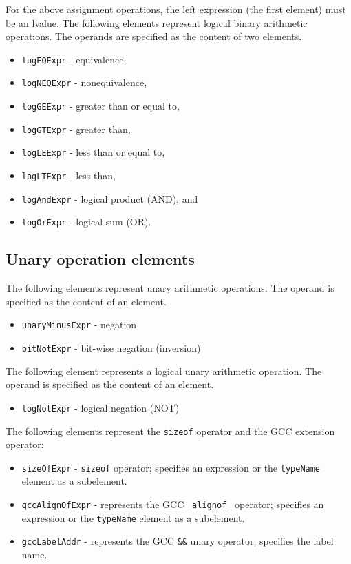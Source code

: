 For the above assignment operations, the left expression (the first element) must be an lvalue.
The following elements represent logical binary arithmetic operations. The operands are specified as the content of two elements.

\begin{itemize}
\item {\tt logEQExpr} - equivalence,
\item {\tt logNEQExpr} - nonequivalence,
\item {\tt logGEExpr} - greater than or equal to,
\item {\tt logGTExpr} - greater than,
\item {\tt logLEExpr} - less than or equal to,
\item {\tt logLTExpr} - less than,
\item {\tt logAndExpr} - logical product (AND), and
\item {\tt logOrExpr} - logical sum (OR).
\end{itemize}


\subsection{Unary operation elements}

The following elements represent unary arithmetic operations. The operand is specified as the content of an element.

\begin{itemize}
\item {\tt unaryMinusExpr} - negation
\item {\tt bitNotExpr} - bit-wise negation (inversion)
\end{itemize}

The following element represents a logical unary arithmetic operation. The operand is specified as the content of an element.

\begin{itemize}
\item {\tt logNotExpr} - logical negation (NOT)
\end{itemize}

The following elements represent the {\tt sizeof} operator and the GCC extension operator:

\begin{itemize}
\item {\tt sizeOfExpr} - {\tt sizeof} operator; 
specifies an expression or the {\tt typeName} element as a subelement.
\item {\tt gccAlignOfExpr} - represents the GCC {\tt \_alignof\_} operator;
specifies an expression or the {\tt typeName} element as a subelement.
\item {\tt gccLabelAddr} - represents the GCC {\tt \&\&} unary operator;
specifies the label name.
\end{itemize}


